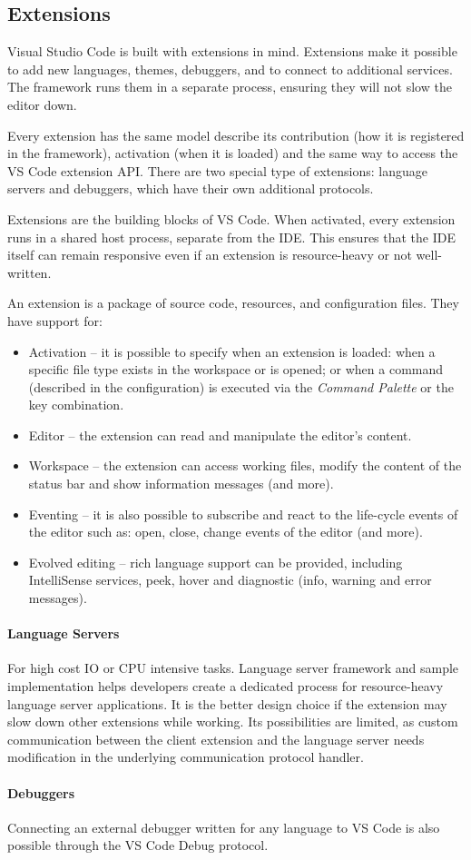 \subsection{Extensions}
Visual Studio Code is built with extensions in mind. Extensions make it possible to add new languages, themes, debuggers, and to connect to additional services. The framework runs them in a separate process, ensuring they will not slow the editor down.

Every extension has the same model describe its contribution (how it is registered in the framework), activation (when it is loaded) and the same way to access the VS Code extension API. There are two special type of extensions: language servers and debuggers, which have their own additional protocols.

Extensions are the building blocks of VS Code. When activated, every extension runs in a shared host process, separate from the IDE. This ensures that the IDE itself can remain responsive even if an extension is resource-heavy or not well-written.

An extension is a package of source code, resources, and configuration files. They have support for:
\begin{itemize}[topsep=0pt]
  \item Activation -- it is possible to specify when an extension is loaded: when a specific file type exists in the workspace or is opened; or when a command (described in the configuration) is executed via the \emph{Command Palette} or the key combination.
  \item Editor -- the extension can read and manipulate the editor's content.
  \item Workspace -- the extension can access working files, modify the content of the status bar and show information messages (and more).
  \item Eventing -- it is also possible to subscribe and react to the life-cycle events of the editor such as: open, close, change events of the editor (and more).
  \item Evolved editing -- rich language support can be provided, including IntelliSense services, peek, hover and diagnostic (info, warning and error messages).
\end{itemize}

\paragraph{Language Servers} For high cost IO or CPU intensive tasks.
Language server framework and sample implementation helps developers create a dedicated process for resource-heavy language server applications. It is the better design choice if the extension may slow down other extensions while working. Its possibilities are limited, as custom communication between the client extension and the language server needs modification in the underlying communication protocol handler.

\paragraph{Debuggers} Connecting an external debugger written for any language to VS Code is also possible through the VS Code Debug protocol.
